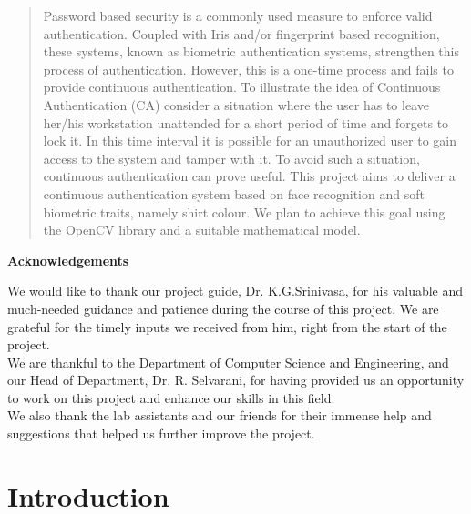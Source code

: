 \documentclass[12pt]{article}			%
\begin{document}
\newpage
\begin{abstract}			%


Password based security is a commonly used measure to enforce valid authentication. Coupled with Iris and/or fingerprint based recognition, these systems, known as biometric authentication systems, strengthen this process of authentication. However, this is a one-time process and fails to provide continuous authentication. To illustrate the idea of Continuous Authentication (CA) consider a situation where the user has to leave her/his workstation unattended for a short period of time and forgets to lock it. In this time interval it is possible for an unauthorized user to gain access to the system and tamper with it. To avoid such a situation, continuous authentication can prove useful. 
This project aims to deliver a continuous authentication system based on face recognition and soft biometric traits, namely shirt colour. We plan to achieve this goal using the OpenCV library and a suitable mathematical model.


\end{abstract}				%
\newpage
\begin{center}
{\LARGE \bf Acknowledgements}
\\[6ex]
\end{center}
We would like to thank our project guide, Dr. K.G.Srinivasa, for his valuable and much-needed guidance and patience during the course of this project. We are grateful for the timely inputs we received from him, right from the start of the project.\\[2ex]
We are thankful to the Department of Computer Science and Engineering, and our Head of Department, Dr. R. Selvarani, for having provided us an opportunity to work on this project and enhance our skills in this field.\\[2ex]
We also thank the lab assistants and our friends for their immense help and suggestions that helped us further improve the project. 
\newpage				%
\tableofcontents			%
\newpage				%

\section{ Introduction }	%
\end{document}
